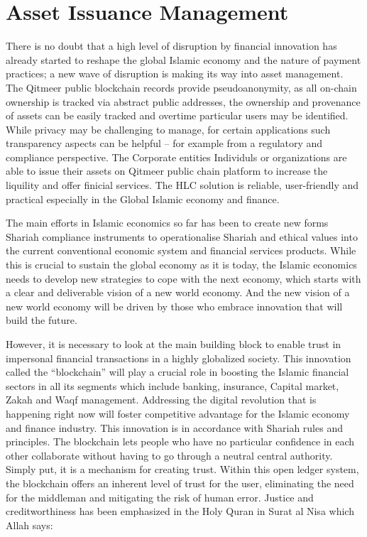 \documentclass[a4paper,11pt]{article}
\begin{document}
\section{Asset Issuance Management}

There is no doubt that a high level of disruption by financial innovation has already started to reshape the global Islamic economy and the nature of payment practices; a new wave of disruption is making its way into asset management. The Qitmeer public blockchain records provide pseudoanonymity, as all on-chain ownership is tracked via abstract public addresses, the ownership and provenance of assets can be easily tracked and overtime particular users may be identified. While privacy may be challenging to manage, for certain applications such transparency aspects can be helpful – for example from a regulatory and compliance perspective. The Corporate entities Individuls or organizations are able to issue their assets on Qitmeer public chain platform to increase the liquility and offer finicial services. The HLC solution is reliable, user-friendly and practical especially in the Global Islamic economy and finance.

The main efforts in Islamic economics so far has been to create new forms Shariah compliance instruments to operationalise Shariah and ethical values into the current conventional economic system and financial services products. While this is crucial to sustain the global economy as it is today, the Islamic economics needs to develop new strategies to cope with the next economy, which starts with a clear and deliverable vision of a new world economy. And the new vision of a new world economy will be driven by those who embrace innovation that will build the future. 

However, it is necessary to look at the main building block to enable trust in impersonal financial transactions in a highly globalized society. This innovation called the “blockchain” will play a crucial role in boosting the Islamic financial sectors in all its segments which include banking, insurance, Capital market, Zakah and Waqf management. Addressing the digital revolution that is happening right now will foster competitive advantage for the Islamic economy and finance industry. This innovation is in accordance with Shariah rules and principles.
The blockchain lets people who have no particular confidence in each other collaborate without having to go through a neutral central authority. Simply put, it is a mechanism for creating trust. Within this open ledger system, the blockchain offers an inherent level of trust for the user, eliminating the need for the middleman and mitigating the risk of human error. Justice and creditworthiness has been emphasized in the Holy Quran in Surat al Nisa which Allah says: 
\end{document}
